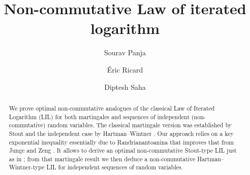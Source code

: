 \documentclass[10pt]{amsart}
\theoremstyle{definition}
\theoremstyle{myremark}
\numberwithin{equation}{section}
\begin{document}
	\title[Law of iterated logarithm]{Non-commutative Law of iterated logarithm}


	\author[S. Panja]{Sourav Panja}
	\address{Theoretical Statistics and Mathematics Unit, Indian Statistical Institute, Delhi, India}

	\author[\'E. Ricard]{\'Eric Ricard}
	\address{Université Caen Normandie, CNRS, LMNO UMR6139, F-14000 CAEN, FRANCE.}
	
	\author[D. Saha]{Diptesh Saha}
	\address{Theoretical Statistics and Mathematics Unit, Indian Statistical Institute, Delhi, India}
	
	

	
	

	
	
	
	
	

    \begin{abstract}
    We prove optimal non-commutative analogues of the classical Law of
      Iterated Logarithm (LIL) for both martingales and sequences of
      independent (non-commutative) random variables. The classical
      martingale version was established by Stout
      \cite{stout1970martingale} and the independent case by
      Hartman–Wintner \cite{hartman1941law}. Our approach relies on a
      key exponential inequality essentially due to Randrianantoanina
      \cite{randrianantoanina2024triple} that improves that from Junge
      and Zeng \cite{junge2015noncommutative}. It allows to derive an optimal
      non-commutative Stout-type LIL just as in \cite{zeng2015kolmogorov}; from that martingale result we
      then deduce a non-commutative Hartman–Wintner-type LIL for
      independent sequences of random variables.
    \end{abstract}
\end{document}

